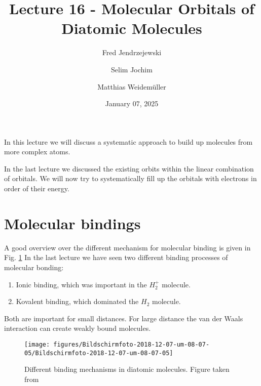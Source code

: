 \documentclass[10pt]{article}
\let\cite\citep
\renewenvironment{abstract}
  {{\bfseries\noindent{\abstractname}\par\nobreak}\footnotesize}
  {\bigskip}
\providecommand\citep{\cite}
\begin{document}
\title{Lecture 16 - Molecular Orbitals of Diatomic Mole\-cules}



\author[1]{Fred Jendrzejewski}%
\author[2]{Selim Jochim}%
\author[2]{Matthias Weidemüller}%
%
%


\vspace{-1em}



  
  \date{January 07, 2025}


\begingroup
\let\center\flushleft
\let\endcenter\endflushleft
\maketitle
\endgroup





\begin{abstract}
In this lecture we will discuss a systematic approach to build up molecules from more complex atoms.%
\end{abstract}%



\sloppy


In the last lecture \cite{molecules} we discussed the existing orbits within the linear combination of orbitals. We will now try to systematically fill up the orbitals with electrons in order of their energy.


\section{Molecular bindings}
A good overview over the different mechanism for molecular binding is given in Fig. \ref{305992}
In the last lecture we have seen two different binding processes of molecular bonding:
\begin{enumerate}
\item Ionic binding, which was important in the $H_2^+$ molecule.
\item Kovalent binding, which dominated the $H_2$ molecule.
\end{enumerate}
Both are important for small distances. For large distance the van der Waals interaction can create weakly bound molecules.
\begin{figure}[h!]
\begin{center}
\texttt{[image: figures/Bildschirmfoto-2018-12-07-um-08-07-05/Bildschirmfoto-2018-12-07-um-08-07-05]}
\caption{{Different binding mechanisms in diatomic molecules. Figure taken from
\protect\cite{Hertel_2015}
{\label{305992}}%
}}
\end{center}
\end{figure}
\end{document}
